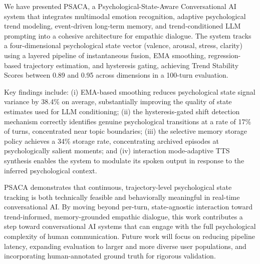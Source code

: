 \documentclass[conference]{IEEEtran}
\begin{document}
We have presented PSACA, a Psychological-State-Aware Conversational AI system that integrates multimodal emotion recognition, adaptive psychological trend modeling, event-driven long-term memory, and trend-conditioned LLM prompting into a cohesive architecture for empathic dialogue. The system tracks a four-dimensional psychological state vector (valence, arousal, stress, clarity) using a layered pipeline of instantaneous fusion, EMA smoothing, regression-based trajectory estimation, and hysteresis gating, achieving Trend Stability Scores between 0.89 and 0.95 across dimensions in a 100-turn evaluation.

Key findings include: (i) EMA-based smoothing reduces psychological state signal variance by 38.4\% on average, substantially improving the quality of state estimates used for LLM conditioning; (ii) the hysteresis-gated shift detection mechanism correctly identifies genuine psychological transitions at a rate of 17\% of turns, concentrated near topic boundaries; (iii) the selective memory storage policy achieves a 34\% storage rate, concentrating archived episodes at psychologically salient moments; and (iv) interaction mode-adaptive TTS synthesis enables the system to modulate its spoken output in response to the inferred psychological context.

PSACA demonstrates that continuous, trajectory-level psychological state tracking is both technically feasible and behaviorally meaningful in real-time conversational AI. By moving beyond per-turn, state-agnostic interaction toward trend-informed, memory-grounded empathic dialogue, this work contributes a step toward conversational AI systems that can engage with the full psychological complexity of human communication. Future work will focus on reducing pipeline latency, expanding evaluation to larger and more diverse user populations, and incorporating human-annotated ground truth for rigorous validation.


\end{document}
